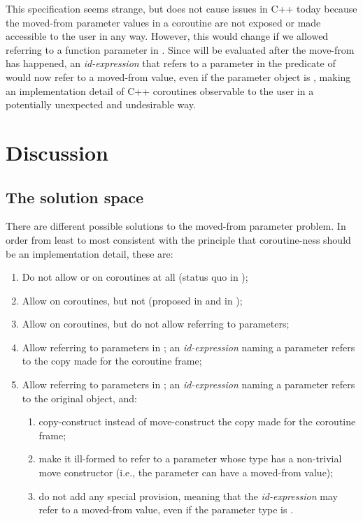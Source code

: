 This specification seems strange, but does not cause issues in C++ today because the moved-from parameter values in a coroutine are not exposed or made accessible to the user in any way. However, this would change if we allowed referring to a function parameter in . Since  will be evaluated after the move-from has happened, an \emph{id-expression} that refers to a parameter in the predicate of  would now refer to a moved-from value, even if the parameter object is , making an implementation detail of C++ coroutines observable to the user in a potentially unexpected and undesirable way.

\section {Discussion}

\subsection{The solution space}
There are different possible solutions to the moved-from parameter problem. In order from least to most consistent with the principle that coroutine-ness should be an implementation detail, these are:
\begin{enumerate}
\item Do not allow  or  on coroutines at all (status quo in \cite{P2900R8});
\item Allow  on coroutines, but not  (proposed in \cite{P2957R1} and in \cite{P3251R0});
\item Allow  on coroutines, but do not allow referring to parameters;
\item Allow referring to parameters in ; an \emph{id-expression} naming a parameter refers to the copy made for the coroutine frame;
\item Allow referring to parameters in ; an \emph{id-expression} naming a parameter refers to the original object, and:
\begin{enumerate}[label=\alph*.,ref=\theenumi\alph*]
        \item copy-construct instead of move-construct the copy made for the coroutine frame;
        \item make it ill-formed to refer to a parameter whose type has a non-trivial move constructor (i.e., the parameter can have a moved-from value);
        \item do not add any special provision, meaning that the \emph{id-expression} may refer to a moved-from value, even if the parameter type is .
\end{enumerate}
\end{enumerate}

